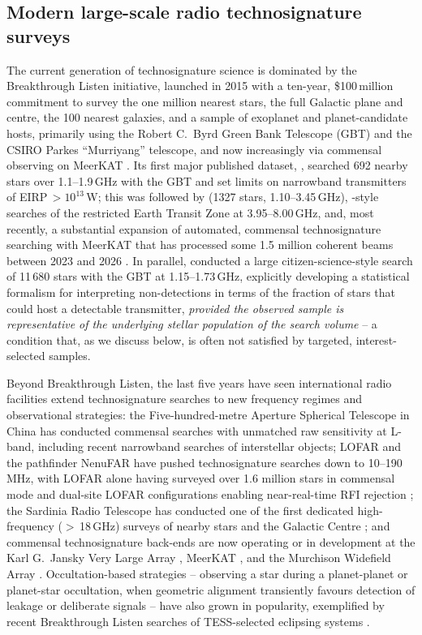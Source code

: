 \documentclass{openjournal}
\begin{document}
\subsection{Modern large-scale radio technosignature surveys}
\label{sec:modern}

The current generation of technosignature science is dominated by the
Breakthrough Listen initiative, launched in 2015 with a ten-year, \$100\,million
commitment to survey the one million nearest stars, the full Galactic plane and
centre, the 100 nearest galaxies, and a sample of exoplanet and planet-candidate
hosts, primarily using the Robert C.\ Byrd Green Bank Telescope (GBT) and the
CSIRO Parkes ``Murriyang'' telescope, and now increasingly via commensal
observing on MeerKAT \citep{BLoverview}. Its first major published dataset,
\citet{Enriquez2017}, searched 692 nearby stars over 1.1--1.9\,GHz with the GBT
and set limits on narrowband transmitters of EIRP\,$>10^{13}$\,W; this was
followed by \citet{Price2020} (1327 stars, 1.10--3.45\,GHz),
\citet{Gajjar2019EarthTransitZone}-style searches of the restricted Earth Transit
Zone at 3.95--8.00\,GHz, and, most recently, a substantial expansion of automated,
commensal technosignature searching with MeerKAT that has processed some 1.5
million coherent beams between 2023 and 2026 \citep{BLMeerKAT2026}. In parallel,
\citet{Margot2023} conducted a large citizen-science-style search of 11\,680
stars with the GBT at 1.15--1.73\,GHz, explicitly developing a statistical
formalism for interpreting non-detections in terms of the fraction of stars that
could host a detectable transmitter, \emph{provided the observed sample is
representative of the underlying stellar population of the search volume} -- a
condition that, as we discuss below, is often not satisfied by targeted,
interest-selected samples.

Beyond Breakthrough Listen, the last five years have seen international radio
facilities extend technosignature searches to new frequency regimes and
observational strategies: the Five-hundred-metre Aperture Spherical Telescope
\citep[FAST;][]{Zhang2020, FAST3IATLAS2025} in China has conducted commensal
searches with unmatched raw sensitivity at L-band, including recent narrowband
searches of interstellar objects; LOFAR and the pathfinder NenuFAR have pushed
technosignature searches down to 10--190\,MHz, with LOFAR alone having surveyed
over 1.6 million stars in commensal mode and dual-site LOFAR configurations
enabling near-real-time RFI rejection \citep{LOFARdualsite2023}; the Sardinia
Radio Telescope has conducted one of the first dedicated high-frequency
($>$\,18\,GHz) surveys of nearby stars and the Galactic Centre
\citep{SRT2025}; and commensal technosignature back-ends are now operating or in
development at the Karl G.\ Jansky Very Large Array \citep[the COSMIC
system;][]{Tremblay2024}, MeerKAT \citep{Czech2021}, and the Murchison Widefield
Array \citep{Morrison2023}. Occultation-based strategies -- observing a star
during a planet-planet or planet-star occultation, when geometric alignment
transiently favours detection of leakage or deliberate signals -- have also grown
in popularity, exemplified by recent Breakthrough Listen searches of TESS-selected
eclipsing systems \citep{TESSeclipsing2025}.
\end{document}
